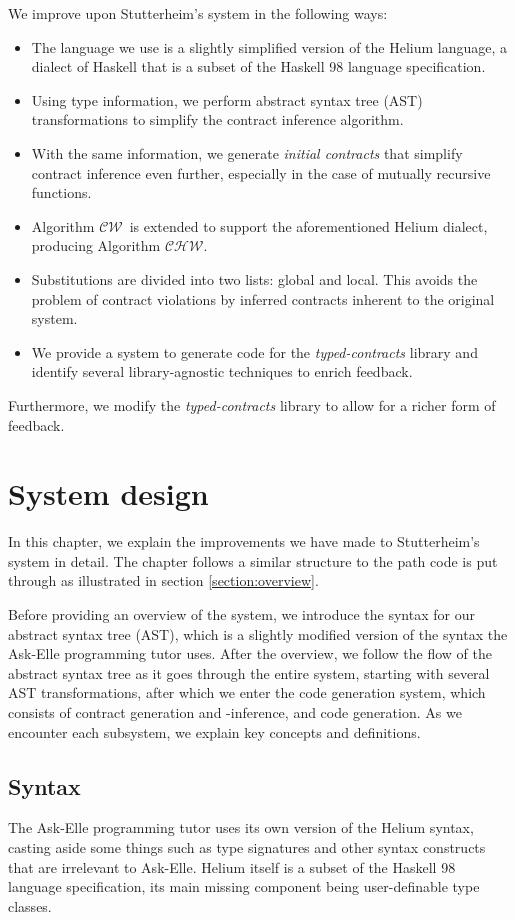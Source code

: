 \documentclass[10pt]{report}
\newcommand{\CW}{$\mathcal{CW}$}
\newcommand{\CHW}{$\mathcal{CHW}$}
\begin{document}
We improve upon Stutterheim's system in the following ways:
\begin{itemize}
	\item The language we use is a slightly simplified version of the Helium language, a dialect of Haskell that is a subset of the Haskell 98 language specification.
	\item Using type information, we perform abstract syntax tree (AST) transformations to simplify the contract inference algorithm.
	\item With the same information, we generate \textit{initial contracts} that simplify contract inference even further, especially in the case of mutually recursive functions.
	\item Algorithm \CW ~is extended to support the aforementioned Helium dialect, producing Algorithm \CHW.
	\item Substitutions are divided into two lists: global and local. This avoids the problem of contract violations by inferred contracts inherent to the original system.
	\item We provide a system to generate code for the \textit{typed-contracts} library and identify several library-agnostic techniques to enrich feedback.
\end{itemize}

Furthermore, we modify the \textit{typed-contracts} library to allow for a richer form of feedback.

\chapter{System design}
\label{chapter-system-design}

In this chapter, we explain the improvements we have made to Stutterheim's system in detail.
The chapter follows a similar structure to the path code is put through as illustrated in section \ref{section:overview}.

Before providing an overview of the system, we introduce the syntax for our abstract syntax tree (AST), which is a slightly modified version of the syntax the Ask-Elle programming tutor uses.
After the overview, we follow the flow of the abstract syntax tree as it goes through the entire system, starting with several AST transformations, after which we enter the code generation system, which consists of contract generation and -inference, and code generation.
As we encounter each subsystem, we explain key concepts and definitions.

\section{Syntax}
The Ask-Elle programming tutor uses its own version of the Helium syntax, casting aside some things such as type signatures and other syntax constructs that are irrelevant to Ask-Elle.
Helium itself is a subset of the Haskell 98 language specification, its main missing component being user-definable type classes.
\end{document}
